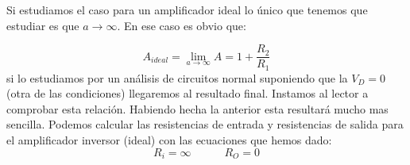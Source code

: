 \documentclass[12pt,a4paper]{article}
\numberwithin{equation}{section}
\numberwithin{figure}{section}
\newcommand{\tquad}{\quad \quad \quad}
\begin{document}




Si estudiamos el caso para un amplificador ideal lo único que tenemos que estudiar es que $a \rightarrow \infty$. En ese caso es obvio que:

\begin{equation}
A_{ideal} = \lim_{a \rightarrow \infty} A = 1 + \dfrac{R_2}{R_1}
\end{equation}
si lo estudiamos por un análisis de circuitos normal suponiendo que la $V_D = 0$ (otra de las condiciones) llegaremos al resultado final. Instamos al lector a comprobar esta relación. Habiendo hecha la anterior esta resultará mucho mas sencilla. Podemos calcular las resistencias de entrada y resistencias de salida para el amplificador inversor (ideal) con las ecuaciones que hemos dado: \\

\begin{equation}
R_i = \infty \tquad R_O = 0
\end{equation}


\end{document}
